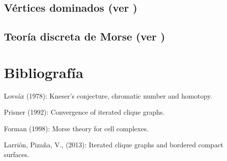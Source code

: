 \documentclass[final]{beamer}
\begin{document}
\begin{frame}[t]
\begin{multicols}{3}
\subsection{Vértices dominados (ver \cite{prisner})}

\subsection{Teoría discreta de Morse (ver \cite{ref3})}

\section{Bibliografía}

\begin{thebibliography}{99}

 Lovsáz (1978):  Kneser's conjecture, chromatic number and homotopy.

 Prisner (1992): Convergence of iterated clique graphs.

 Forman (1998): Morse theory for cell complexes.
  
 Larrión, Pizaña, V., (2013): Iterated clique graphs and bordered compact surfaces.



\end{thebibliography}

\end{multicols}

\end{frame}
\end{document}
